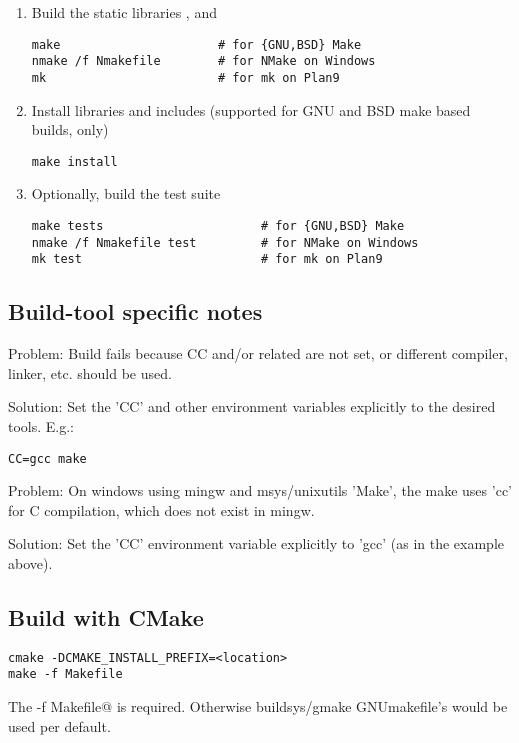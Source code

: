 \begin{enumerate}
\item Build the static libraries ,  and 
\begin{lstlisting}
make                      # for {GNU,BSD} Make
nmake /f Nmakefile        # for NMake on Windows
mk                        # for mk on Plan9
\end{lstlisting}

\item Install libraries and includes (supported for GNU and BSD make based builds, only)
\begin{lstlisting}
make install 
\end{lstlisting}

\item Optionally, build the test suite
\begin{lstlisting}
make tests                      # for {GNU,BSD} Make
nmake /f Nmakefile test         # for NMake on Windows
mk test                         # for mk on Plan9
\end{lstlisting}%
\end{enumerate}

\subsection{Build-tool specific notes}

Problem: Build fails because CC and/or related are not set, or different compiler,
linker, etc. should be used.

Solution: Set the 'CC' and other environment variables explicitly to the desired
tools. E.g.:

\begin{lstlisting}
CC=gcc make
\end{lstlisting}


Problem: On windows using mingw and msys/unixutils 'Make', the make uses
'cc' for C compilation, which does not exist in mingw.

Solution: Set the 'CC' environment variable explicitly to 'gcc' (as in
the example above).

\subsection{Build with CMake}

\begin{lstlisting}
cmake -DCMAKE_INSTALL_PREFIX=<location>
make -f Makefile
\end{lstlisting}

The \verb@-f Makefile@ is required. Otherwise buildsys/gmake GNUmakefile's 
would be used per default.


